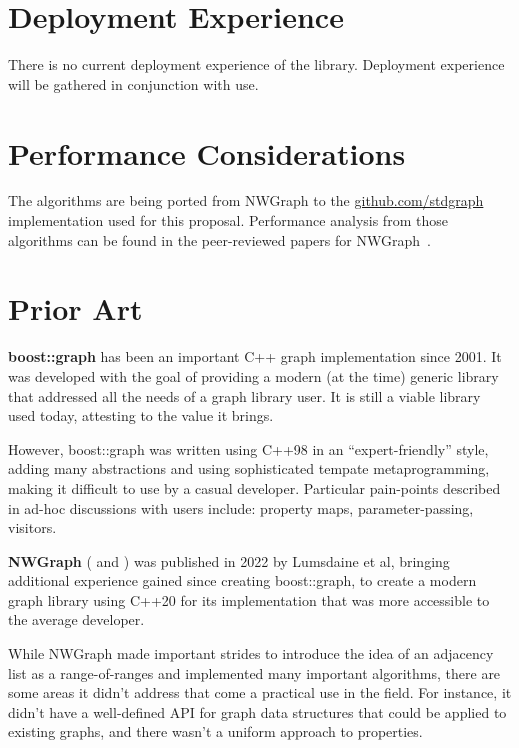 \section{Deployment Experience}
There is no current deployment experience of the library. Deployment experience will be gathered in conjunction with use.

\section{Performance Considerations}
The algorithms are being ported from NWGraph to the \href{https://github.com/stdgraph}{github.com/stdgraph} implementation used for this proposal. 
Performance analysis from those algorithms can be found in the peer-reviewed papers for NWGraph~\cite{REF_nwgraph_paper,gapbs_2023}.

\section{Prior Art}

\textbf{boost::graph} has been an important C++ graph implementation since 2001. It was developed with the goal of providing
a modern (at the time) generic library that addressed all the needs of a graph library user. It is still a viable library used today, attesting to the value it brings.

However, boost::graph was written using C++98 in an ``expert-friendly'' style, adding many abstractions and using sophisticated tempate metaprogramming, making it difficult to use by a casual developer.  Particular pain-points described in ad-hoc discussions with users  include: property maps, parameter-passing, visitors.

\medskip

\textbf{NWGraph} (\cite{REF_nwgraph_library} and \cite{REF_nwgraph_paper}) was published in 2022
by Lumsdaine et al, bringing additional experience gained since creating boost::graph, to create a modern graph library using C++20 for its implementation 
that was more accessible to the average developer. %

While NWGraph made important strides to introduce the idea of an adjacency list as a range-of-ranges and implemented many important algorithms,
there are some areas it didn't address that come a practical use in the field. For instance, it didn't have a well-defined API for graph
data structures that could be applied to existing graphs, and there wasn't a uniform approach to properties.

